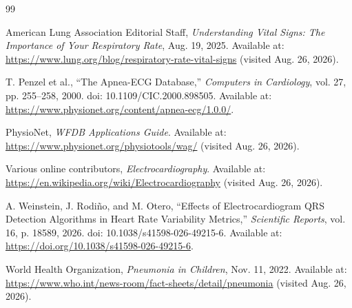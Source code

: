 \documentclass[a4paper,10.5pt,oneside]{report}
\begin{document}

\begin{thebibliography}{99}

American Lung Association Editorial Staff,
\textit{Understanding Vital Signs: The Importance of Your Respiratory Rate},
Aug. 19, 2025.
Available at:
\url{https://www.lung.org/blog/respiratory-rate-vital-signs}
(visited Aug. 26, 2026).

T. Penzel et al.,
``The Apnea-ECG Database,''
\textit{Computers in Cardiology},
vol. 27, pp. 255--258, 2000.
doi: 10.1109/CIC.2000.898505.
Available at:
\url{https://www.physionet.org/content/apnea-ecg/1.0.0/}.

PhysioNet,
\textit{WFDB Applications Guide}.
Available at:
\url{https://www.physionet.org/physiotools/wag/}
(visited Aug. 26, 2026).

Various online contributors,
\textit{Electrocardiography}.
Available at:
\url{https://en.wikipedia.org/wiki/Electrocardiography}
(visited Aug. 26, 2026).

A. Weinstein, J. Rodi\~no, and M. Otero,
``Effects of Electrocardiogram QRS Detection Algorithms in Heart Rate Variability Metrics,''
\textit{Scientific Reports},
vol. 16, p. 18589, 2026.
doi: 10.1038/s41598-026-49215-6.
Available at:
\url{https://doi.org/10.1038/s41598-026-49215-6}.

World Health Organization,
\textit{Pneumonia in Children},
Nov. 11, 2022.
Available at:
\url{https://www.who.int/news-room/fact-sheets/detail/pneumonia}
(visited Aug. 26, 2026).

\end{thebibliography}
\end{document}
